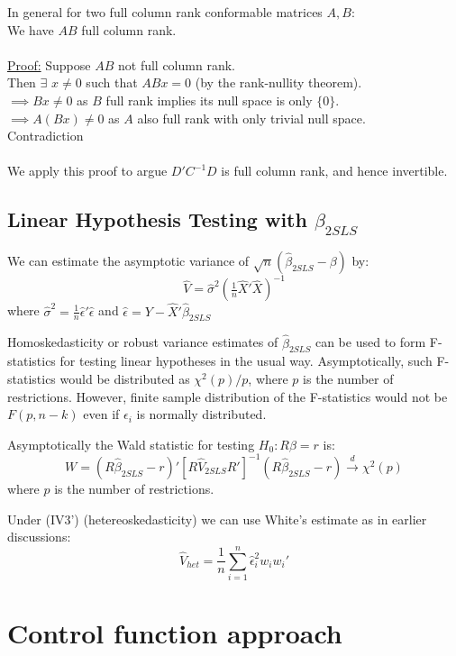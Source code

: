 \documentclass[DIV=14,titlepage=false]{scrreprt}
\begin{document}
\begin{note}
    In general for two full column rank conformable matrices \(A, B\):
    \\ We have \(AB\) full column rank. \\
    \\ \underline{Proof:} 
    Suppose \(AB\) not full column rank. 
    \\ Then \(\exists\) \(x\neq0\) such that \(ABx=0\) (by the rank-nullity theorem). 
    \\ \(\implies Bx\neq0\) as \(B\) full rank implies its null space is only \(\{0\}\). 
    \\ \(\implies A(Bx)\neq0\) as \(A\) also full rank with only trivial null space.
    \\ Contradiction \\ \\
We apply this proof to argue \(D'C^{-1}D\) is full column rank, and hence invertible.
\end{note}

\subsection{Linear Hypothesis Testing with \(\beta_{2SLS}\)}
We can estimate the asymptotic variance of \(\sqrt{n}(\hat\beta_{2SLS}-\beta)\) by:
\[\hat V=\hat\sigma^2(\tfrac{1}{n}\hat X' \hat X)^{-1}\]
where \(\hat\sigma^2=\tfrac{1}{n}\hat\epsilon'\hat\epsilon\) and \(\hat\epsilon=Y-\hat X'\hat\beta_{2SLS}\)

Homoskedasticity or robust variance estimates of \(\hat\beta_{2SLS}\) can be used to form F-statistics for testing linear hypotheses in the usual way.
Asymptotically, such F-statistics would be distributed as \(\chi^2(p)/p\), where \(p\) is the number of restrictions. However, finite sample distribution of the F-statistics would not be \(F(p,n-k)\) even if \(\epsilon_i\) is normally distributed.

Asymptotically the Wald statistic for testing \(H_0:R\beta=r\) is:
\[W=(R\hat\beta_{2SLS}-r)'[R\hat V_{2SLS}R']^{-1}(R\hat\beta_{2SLS}-r)\xrightarrow{d}\chi^2(p)\]
where \(p\) is the number of restrictions.

\begin{note}
    Under (IV3') (hetereoskedasticity) we can use White's estimate as in earlier discussions:
\[\hat V_{het}= \frac{1}{n}\sum_{i=1}^n \hat\epsilon_i^2 w_i w_i'\]
\end{note}

\section{Control function approach}
\end{document}
